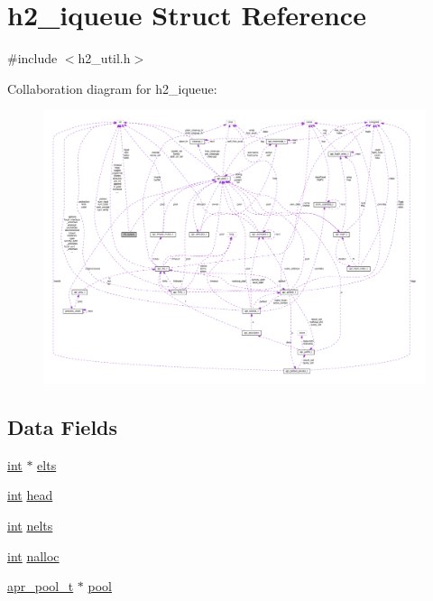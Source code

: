 \hypertarget{structh2__iqueue}{}\section{h2\+\_\+iqueue Struct Reference}
\label{structh2__iqueue}


{\ttfamily \#include $<$h2\+\_\+util.\+h$>$}



Collaboration diagram for h2\+\_\+iqueue\+:
\nopagebreak
\begin{figure}[H]
\begin{center}
\leavevmode
\includegraphics[width=350pt]{structh2__iqueue__coll__graph}
\end{center}
\end{figure}
\subsection*{Data Fields}
\begin{DoxyCompactItemize}
\item 
\hyperlink{pcre_8txt_a42dfa4ff673c82d8efe7144098fbc198}{int} $\ast$ \hyperlink{structh2__iqueue_a8fcc1a7ee4f72bda8c6e5a34a388708e}{elts}
\item 
\hyperlink{pcre_8txt_a42dfa4ff673c82d8efe7144098fbc198}{int} \hyperlink{structh2__iqueue_a1d90810fdddd2635042a27eab2f1c449}{head}
\item 
\hyperlink{pcre_8txt_a42dfa4ff673c82d8efe7144098fbc198}{int} \hyperlink{structh2__iqueue_a1416b7b9170158f3bc75bee34f926e2d}{nelts}
\item 
\hyperlink{pcre_8txt_a42dfa4ff673c82d8efe7144098fbc198}{int} \hyperlink{structh2__iqueue_ae1c200c70ebbcb1b64a77a608535966a}{nalloc}
\item 
\hyperlink{structapr__pool__t}{apr\+\_\+pool\+\_\+t} $\ast$ \hyperlink{structh2__iqueue_a3116560ab576462ef903945181fd16c6}{pool}
\end{DoxyCompactItemize}


